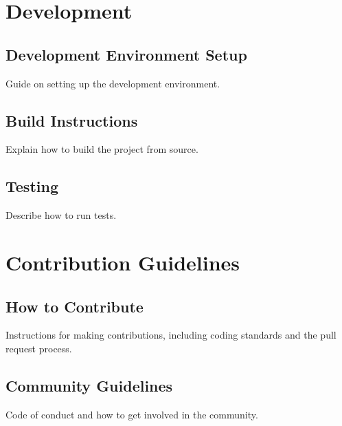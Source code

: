 \documentclass[letterpaper,10pt,english]{sphinxmanual}
\begin{document}
\sphinxstepscope


\chapter{Development}
\label{\detokenize{development:development}}\label{\detokenize{development::doc}}

\section{Development Environment Setup}
\label{\detokenize{development:development-environment-setup}}
\sphinxAtStartPar
Guide on setting up the development environment.


\section{Build Instructions}
\label{\detokenize{development:build-instructions}}
\sphinxAtStartPar
Explain how to build the project from source.


\section{Testing}
\label{\detokenize{development:testing}}
\sphinxAtStartPar
Describe how to run tests.

\sphinxstepscope


\chapter{Contribution Guidelines}
\label{\detokenize{contribution_guidelines:contribution-guidelines}}\label{\detokenize{contribution_guidelines::doc}}

\section{How to Contribute}
\label{\detokenize{contribution_guidelines:how-to-contribute}}
\sphinxAtStartPar
Instructions for making contributions, including coding standards and the pull request process.


\section{Community Guidelines}
\label{\detokenize{contribution_guidelines:community-guidelines}}
\sphinxAtStartPar
Code of conduct and how to get involved in the community.

\sphinxstepscope
\end{document}

